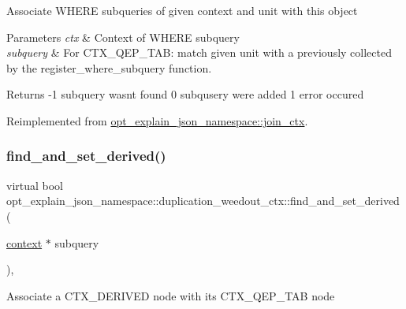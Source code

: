 Associate W\+H\+E\+RE subqueries of given context and unit with this object


\begin{DoxyParams}{Parameters}
{\em ctx} & Context of W\+H\+E\+RE subquery \\
\hline
{\em subquery} & For C\+T\+X\+\_\+\+Q\+E\+P\+\_\+\+T\+AB\+: match given unit with a previously collected by the register\+\_\+where\+\_\+subquery function. \\
\hline
\end{DoxyParams}
\begin{DoxyReturn}{Returns}
-\/1 subquery wasn\textquotesingle{}t found 0 subqusery were added 1 error occured 
\end{DoxyReturn}


Reimplemented from \mbox{\hyperlink{classopt__explain__json__namespace_1_1join__ctx_a6d8ebc9b02d479b1b93d2a55b1e1f5ef}{opt\+\_\+explain\+\_\+json\+\_\+namespace\+::join\+\_\+ctx}}.

\mbox{\label{classopt__explain__json__namespace_1_1duplication__weedout__ctx_a2ff1982ca0d17cea2655f6273c229dd7}} 
\subsubsection{\texorpdfstring{find\+\_\+and\+\_\+set\+\_\+derived()}{find\_and\_set\_derived()}}
{\footnotesize\ttfamily virtual bool opt\+\_\+explain\+\_\+json\+\_\+namespace\+::duplication\+\_\+weedout\+\_\+ctx\+::find\+\_\+and\+\_\+set\+\_\+derived (\begin{DoxyParamCaption}\item[{\mbox{\hyperlink{classopt__explain__json__namespace_1_1context}{context}} $\ast$}]{subquery }\end{DoxyParamCaption})\hspace{0.3cm}{\ttfamily [inline]}, {\ttfamily [virtual]}}

Associate a C\+T\+X\+\_\+\+D\+E\+R\+I\+V\+ED node with its C\+T\+X\+\_\+\+Q\+E\+P\+\_\+\+T\+AB node


